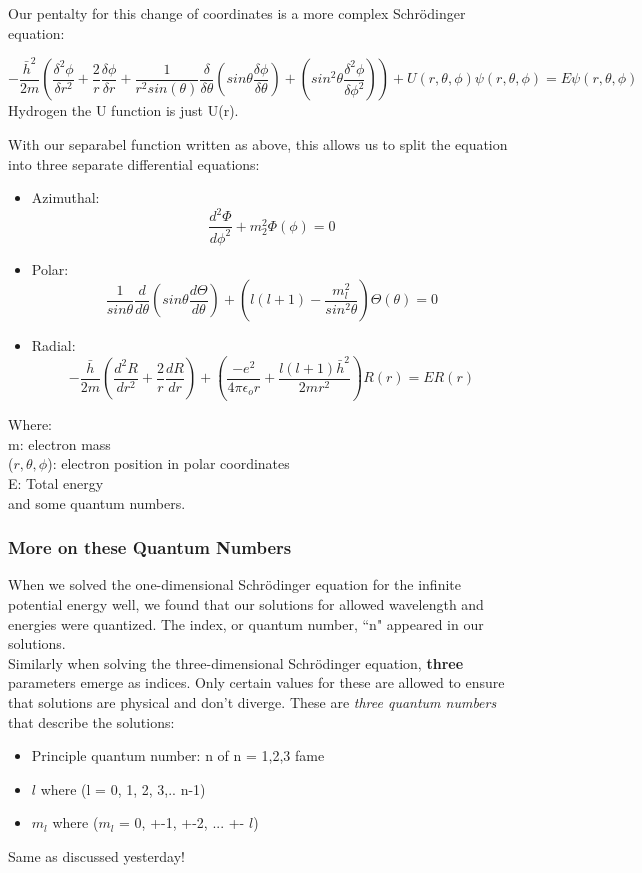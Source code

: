 \documentclass[class=article,crop=false]{standalone}
\begin{document}
Our pentalty for this change of coordinates is a more complex Schrödinger equation:

$$ -\frac{\bar{h}^2}{2m} \left(\frac{\delta^2\phi}{\delta r^2} + \frac{2}{r}\frac{\delta \phi}{\delta r} + \frac{1}{r^2 sin(\theta)} \frac{\delta}{\delta \theta} \left(sin\theta \frac{\delta\phi}{\delta \theta} \right) + \left(sin^2\theta \frac{\delta^2\phi}{\delta \phi^2} \right) \right) + U(r, \theta, \phi) \psi(r, \theta, \phi) = E\psi(r, \theta, \phi) $$
Hydrogen the U function is just U(r).

With our separabel function written as above, this allows us to split the equation into three separate differential equations:

\begin{itemize}
	\item Azimuthal: 
		$$ \frac{d^2\Phi}{d\phi^2} + m_2^2 \Phi(\phi) = 0 $$
	\item Polar: 
		$$ \frac{1}{sin\theta} \frac{d}{d\theta} \left( sin\theta \frac{d\Theta}{d\theta} \right) + \left( l(l+1) - \frac{m_l^2}{sin^2\theta} \right) \Theta(\theta) = 0 $$
	\item Radial:
		$$ -\frac{\bar{h}}{2m} \left( \frac{d^2R}{dr^2} + \frac{2}{r} \frac{dR}{dr} \right) + \left( \frac{-e^2}{4 \pi \epsilon_o r} + \frac{l(l+1) \bar{h}^2}{2mr^2} \right) R(r) = E R(r) $$
\end{itemize}
Where: \\
m: electron mass \\
($r, \theta, \phi$): electron position in polar coordinates \\
E: Total energy \\
and some quantum numbers.


\subsubsection{More on these Quantum Numbers}
When we solved the one-dimensional Schrödinger equation for the infinite potential energy well, we found that our solutions for allowed wavelength and energies were quantized. The index, or quantum number, ``n" appeared  in our solutions. \\

Similarly when solving the three-dimensional Schrödinger equation, \textbf{three} parameters emerge as indices. Only certain values for these are allowed to ensure that solutions are physical and don't diverge. These are \emph{three quantum numbers} that describe the solutions:
\begin{itemize}
	\item Principle quantum number: n of n = 1,2,3 fame
	\item $l$ where (l = 0, 1, 2, 3,.. n-1)
	\item $m_l$ where ($m_l$ = 0, +-1, +-2, ... +- $l$) 
\end{itemize}
Same as discussed yesterday!
\end{document}
